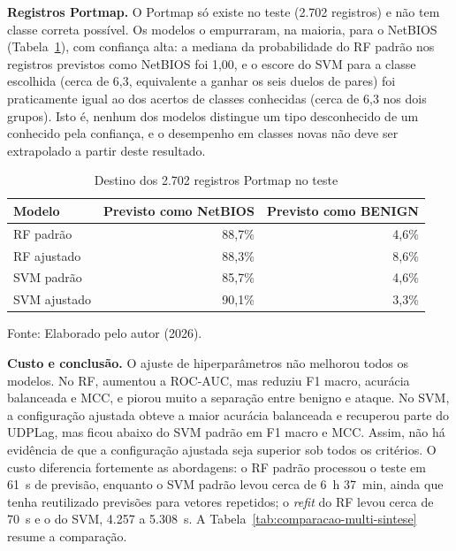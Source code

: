 \documentclass[
    12pt,                %
    openright,           %
    oneside,             %
    a4paper,             %
    english,             %
    brazil               %
]{abntex2}
\begin{document}
\textbf{Registros Portmap.} O Portmap só existe no teste (2.702 registros) e não tem classe correta possível. Os modelos o empurraram, na maioria, para o NetBIOS (Tabela~\ref{tab:comparacao-multi-portmap}), com confiança alta: a mediana da probabilidade do RF padrão nos registros previstos como NetBIOS foi 1,00, e o escore do SVM para a classe escolhida (cerca de 6,3, equivalente a ganhar os seis duelos de pares) foi praticamente igual ao dos acertos de classes conhecidas (cerca de 6,3 nos dois grupos). Isto é, nenhum dos modelos distingue um tipo desconhecido de um conhecido pela confiança, e o desempenho em classes novas não deve ser extrapolado a partir deste resultado.
 
\begin{table}
\centering
\caption{Destino dos 2.702 registros Portmap no teste}
\label{tab:comparacao-multi-portmap}
\begin{tabular}{lrr}
\hline
Modelo & Previsto como NetBIOS & Previsto como BENIGN \\
\hline
RF padrão    & 88,7\% & 4,6\% \\
RF ajustado  & 88,3\% & 8,6\% \\
SVM padrão   & 85,7\% & 4,6\% \\
SVM ajustado & 90,1\% & 3,3\% \\
\hline
\end{tabular}
\par\smallskip
Fonte: Elaborado pelo autor (2026).
\end{table}
 
\textbf{Custo e conclusão.} O ajuste de hiperparâmetros não melhorou todos os modelos. No RF, aumentou a ROC-AUC, mas reduziu F1 macro, acurácia balanceada e MCC, e piorou muito a separação entre benigno e ataque. No SVM, a configuração ajustada obteve a maior acurácia balanceada e recuperou parte do UDPLag, mas ficou abaixo do SVM padrão em F1 macro e MCC. Assim, não há evidência de que a configuração ajustada seja superior sob todos os critérios. O custo diferencia fortemente as abordagens: o RF padrão processou o teste em 61~s de previsão, enquanto o SVM padrão levou cerca de 6~h 37~min, ainda que tenha reutilizado previsões para vetores repetidos; o \textit{refit} do RF levou cerca de 70~s e o do SVM, 4.257 a 5.308~s. A Tabela~\ref{tab:comparacao-multi-sintese} resume a comparação.
 
\end{document}
